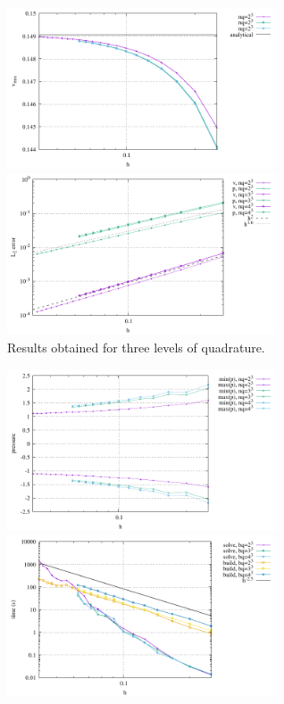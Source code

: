\begin{center}
\includegraphics[width=8cm]{python_codes/fieldstone_82/results/bench5/vrms.pdf}
\includegraphics[width=8cm]{python_codes/fieldstone_82/results/bench5/conv.pdf}\\
{\captionfont Results obtained for three levels of quadrature.}
\end{center}


\begin{center}
\includegraphics[width=8cm]{python_codes/fieldstone_82/results/bench5/p_stats.pdf}
\includegraphics[width=8cm]{python_codes/fieldstone_82/results/bench5/times.pdf}
\end{center}

